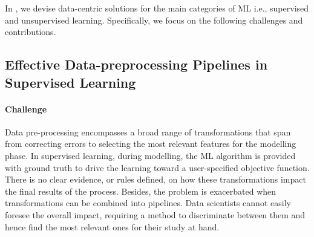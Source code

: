 In , we devise data-centric solutions for the main categories of ML i.e., supervised and unsupervised learning.
Specifically, we focus on the following challenges and contributions.


\subsection*{Effective Data-preprocessing Pipelines in Supervised Learning}

\paragraph{Challenge} Data pre-processing
encompasses a broad range of transformations that span from correcting errors to selecting the most relevant features for the modelling phase.
In supervised learning, during modelling, the ML algorithm is provided with ground truth to drive the learning toward a user-specified objective function.
There is no clear evidence, or rules defined, on how these transformations impact the final results of the process.
Besides, the problem is exacerbated when transformations can be combined into pipelines.
Data scientists cannot easily foresee the overall impact, requiring a method to discriminate between them and hence find the most relevant ones for their study at hand.

